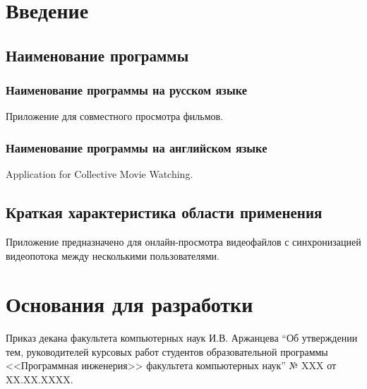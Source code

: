 \section{Введение}

\subsection{Наименование программы}

\subsubsection{Наименование программы на русском языке}

Приложение для совместного просмотра фильмов.

\subsubsection{Наименование программы на английском языке}

Application for Collective Movie Watching.

\subsection{Краткая характеристика области применения}

Приложение предназначено для онлайн-просмотра видеофайлов с синхронизацией видеопотока между несколькими пользователями.


\section{Основания для разработки}

Приказ декана факультета компьютерных наук И.В. Аржанцева ``Об утверждении тем, руководителей курсовых работ студентов
образовательной программы <<Программная инженерия>> факультета компьютерных наук'' № XXX от XX.XX.XXXX.
